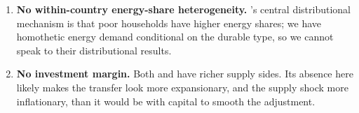 \begin{enumerate}
\item \textbf{No within-country energy-share heterogeneity.}
\citet{Bayer2026}'s central distributional mechanism is that poor households
have higher energy shares; we have homothetic energy demand conditional on
the durable type, so we cannot speak to their distributional results.

\item \textbf{No investment margin.} Both \citet{Bayer2026} and
\citet{ARS2024} have richer supply sides. Its absence here likely makes the
transfer look more expansionary, and the supply shock more inflationary, than
it would be with capital to smooth the adjustment.

\end{enumerate}
